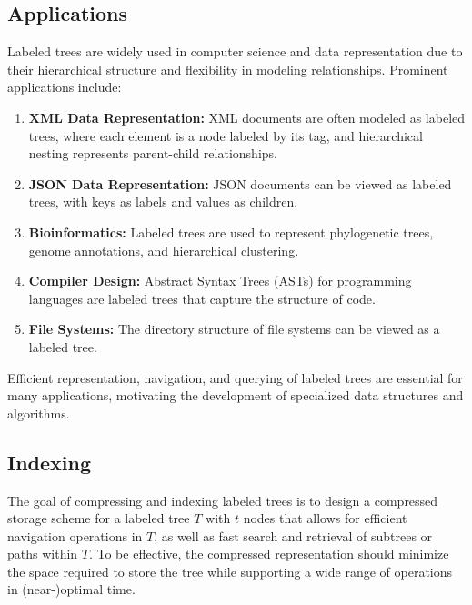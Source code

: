 \subsection{Applications}
Labeled trees are widely used in computer science and data representation due to their hierarchical structure and flexibility in modeling relationships. Prominent applications include:
\begin{enumerate}
    \item \textbf{XML Data Representation:} XML documents are often modeled as labeled trees, where each element is a node labeled by its tag, and hierarchical nesting represents parent-child relationships.
    \item \textbf{JSON Data Representation:} JSON documents can be viewed as labeled trees, with keys as labels and values as children.
    \item \textbf{Bioinformatics:} Labeled trees are used to represent phylogenetic trees, genome annotations, and hierarchical clustering.
    \item \textbf{Compiler Design:} Abstract Syntax Trees (ASTs) for programming languages are labeled trees that capture the structure of code.
    \item \textbf{File Systems:} The directory structure of file systems can be viewed as a labeled tree.
\end{enumerate}

Efficient representation, navigation, and querying of labeled trees are essential for many applications, motivating the development of specialized data structures and algorithms. 

\subsection{Indexing} \label{compandindexinglabtree}
The goal of compressing and indexing labeled trees is to design a compressed storage scheme for a labeled tree $T$ with $t$ nodes that allows for efficient navigation operations in $T$, as well as fast search and retrieval of subtrees or paths within $T$. To be effective, the compressed representation should minimize the space required to store the tree while supporting a wide range of operations in (near-)optimal time.

